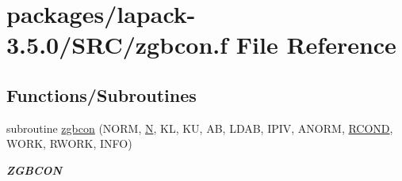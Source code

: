\hypertarget{zgbcon_8f}{}\section{packages/lapack-\/3.5.0/\+S\+R\+C/zgbcon.f File Reference}
\label{zgbcon_8f}
\subsection*{Functions/\+Subroutines}
\begin{DoxyCompactItemize}
\item 
subroutine \hyperlink{group__complex16GBcomputational_ga8738f3a065af06737854349ab50a3015}{zgbcon} (N\+O\+R\+M, \hyperlink{polmisc_8c_a0240ac851181b84ac374872dc5434ee4}{N}, K\+L, K\+U, A\+B, L\+D\+A\+B, I\+P\+I\+V, A\+N\+O\+R\+M, \hyperlink{superlu__enum__consts_8h_af00a42ecad444bbda75cde1b64bd7e72a9b5c151728d8512307565994c89919d5}{R\+C\+O\+N\+D}, W\+O\+R\+K, R\+W\+O\+R\+K, I\+N\+F\+O)
\begin{DoxyCompactList}\small\item\em {\bfseries Z\+G\+B\+C\+O\+N} \end{DoxyCompactList}\end{DoxyCompactItemize}
